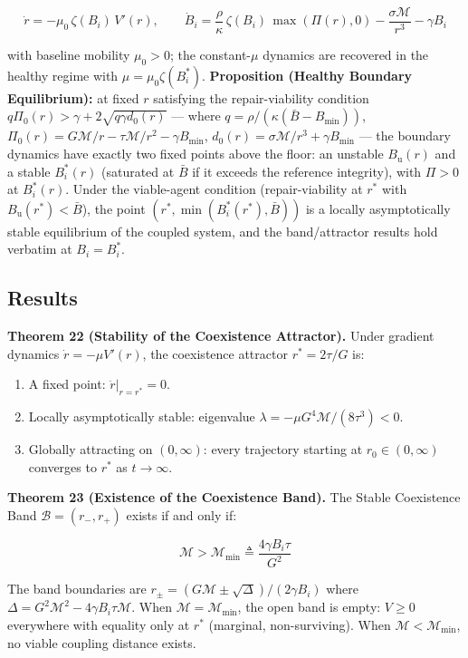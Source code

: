 \documentclass[11pt]{article}
\begin{document}
\[\dot{r} = -\mu_0\,\zeta(B_i)\,V'(r), \qquad \dot{B}_i = \frac{\rho}{\kappa}\,\zeta(B_i)\,\max(\Pi(r), 0) - \frac{\sigma\mathcal{M}}{r^3} - \gamma B_i\]

with baseline mobility \(\mu_0 > 0\); the constant-\(\mu\) dynamics are
recovered in the healthy regime with \(\mu = \mu_0\zeta(B_i^*)\).
\textbf{Proposition (Healthy Boundary Equilibrium):} at fixed \(r\)
satisfying the repair-viability condition
\(q\Pi_0(r) > \gamma + 2\sqrt{q\gamma d_0(r)}\) --- where
\(q = \rho/(\kappa(\bar{B} - B_{\min}))\),
\(\Pi_0(r) = G\mathcal{M}/r - \tau\mathcal{M}/r^2 - \gamma B_{\min}\),
\(d_0(r) = \sigma\mathcal{M}/r^3 + \gamma B_{\min}\) --- the boundary
dynamics have exactly two fixed points above the floor: an unstable
\(B_{\mathrm{u}}(r)\) and a stable \(B_i^*(r)\) (saturated at
\(\bar{B}\) if it exceeds the reference integrity), with \(\Pi > 0\) at
\(B_i^*(r)\). Under the viable-agent condition (repair-viability at
\(r^*\) with \(B_{\mathrm{u}}(r^*) < \bar{B}\)), the point
\((r^*, \min(B_i^*(r^*), \bar{B}))\) is a locally asymptotically stable
equilibrium of the coupled system, and the band/attractor results hold
verbatim at \(B_i = B_i^*\).

\subsection{Results}\label{results}

\textbf{Theorem 22 (Stability of the Coexistence Attractor).} Under
gradient dynamics \(\dot{r} = -\mu V'(r)\), the coexistence attractor
\(r^* = 2\tau/G\) is:

\begin{enumerate}
\def\labelenumi{(\alph{enumi})}
\item
  A fixed point: \(\dot{r}|_{r=r^*} = 0\).
\item
  Locally asymptotically stable: eigenvalue
  \(\lambda = -\mu G^4\mathcal{M}/(8\tau^3) < 0\).
\item
  Globally attracting on \((0, \infty)\): every trajectory starting at
  \(r_0 \in (0, \infty)\) converges to \(r^*\) as \(t \to \infty\).
\end{enumerate}

\textbf{Theorem 23 (Existence of the Coexistence Band).} The Stable
Coexistence Band \(\mathcal{B} = (r_-, r_+)\) exists if and only if:

\[\mathcal{M} > \mathcal{M}_{\min} \triangleq \frac{4\gamma B_i \tau}{G^2}\]

The band boundaries are
\(r_\pm = (G\mathcal{M} \pm \sqrt{\Delta})/(2\gamma B_i)\) where
\(\Delta = G^2\mathcal{M}^2 - 4\gamma B_i \tau \mathcal{M}\). When
\(\mathcal{M} = \mathcal{M}_{\min}\), the open band is empty:
\(V \geq 0\) everywhere with equality only at \(r^*\) (marginal,
non-surviving). When \(\mathcal{M} < \mathcal{M}_{\min}\), no viable
coupling distance exists.
\end{document}
